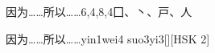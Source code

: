 \begin{entry}{因为……所以……}{6,4,8,4}{⼞、⼂、⼾、⼈}
  \begin{phonetics}{因为……所以……}{yin1wei4 suo3yi3}[][HSK 2]
  \end{phonetics}
\end{entry}
